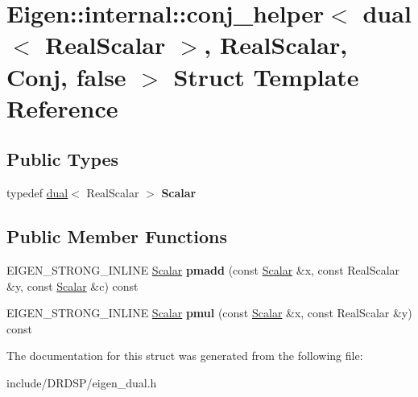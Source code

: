 \hypertarget{struct_eigen_1_1internal_1_1conj__helper_3_01dual_3_01_real_scalar_01_4_00_01_real_scalar_00_01_conj_00_01false_01_4}{\section{Eigen\-:\-:internal\-:\-:conj\-\_\-helper$<$ dual$<$ Real\-Scalar $>$, Real\-Scalar, Conj, false $>$ Struct Template Reference}
\label{struct_eigen_1_1internal_1_1conj__helper_3_01dual_3_01_real_scalar_01_4_00_01_real_scalar_00_01_conj_00_01false_01_4}
}
\subsection*{Public Types}
\begin{DoxyCompactItemize}
\item 
\hypertarget{struct_eigen_1_1internal_1_1conj__helper_3_01dual_3_01_real_scalar_01_4_00_01_real_scalar_00_01_conj_00_01false_01_4_a42d33d54e8a9affc2d61aba4f28900e9}{typedef \hyperlink{struct_d_r_d_s_p_1_1dual}{dual}$<$ Real\-Scalar $>$ {\bfseries Scalar}}\label{struct_eigen_1_1internal_1_1conj__helper_3_01dual_3_01_real_scalar_01_4_00_01_real_scalar_00_01_conj_00_01false_01_4_a42d33d54e8a9affc2d61aba4f28900e9}

\end{DoxyCompactItemize}
\subsection*{Public Member Functions}
\begin{DoxyCompactItemize}
\item 
\hypertarget{struct_eigen_1_1internal_1_1conj__helper_3_01dual_3_01_real_scalar_01_4_00_01_real_scalar_00_01_conj_00_01false_01_4_a9f69922776f65ba100884d5100c0c061}{E\-I\-G\-E\-N\-\_\-\-S\-T\-R\-O\-N\-G\-\_\-\-I\-N\-L\-I\-N\-E \hyperlink{struct_d_r_d_s_p_1_1dual}{Scalar} {\bfseries pmadd} (const \hyperlink{struct_d_r_d_s_p_1_1dual}{Scalar} \&x, const Real\-Scalar \&y, const \hyperlink{struct_d_r_d_s_p_1_1dual}{Scalar} \&c) const }\label{struct_eigen_1_1internal_1_1conj__helper_3_01dual_3_01_real_scalar_01_4_00_01_real_scalar_00_01_conj_00_01false_01_4_a9f69922776f65ba100884d5100c0c061}

\item 
\hypertarget{struct_eigen_1_1internal_1_1conj__helper_3_01dual_3_01_real_scalar_01_4_00_01_real_scalar_00_01_conj_00_01false_01_4_a5308d7b5d2bf6a4dbe47cf00a974d3cb}{E\-I\-G\-E\-N\-\_\-\-S\-T\-R\-O\-N\-G\-\_\-\-I\-N\-L\-I\-N\-E \hyperlink{struct_d_r_d_s_p_1_1dual}{Scalar} {\bfseries pmul} (const \hyperlink{struct_d_r_d_s_p_1_1dual}{Scalar} \&x, const Real\-Scalar \&y) const }\label{struct_eigen_1_1internal_1_1conj__helper_3_01dual_3_01_real_scalar_01_4_00_01_real_scalar_00_01_conj_00_01false_01_4_a5308d7b5d2bf6a4dbe47cf00a974d3cb}

\end{DoxyCompactItemize}


The documentation for this struct was generated from the following file\-:\begin{DoxyCompactItemize}
\item 
include/\-D\-R\-D\-S\-P/eigen\-\_\-dual.\-h\end{DoxyCompactItemize}

